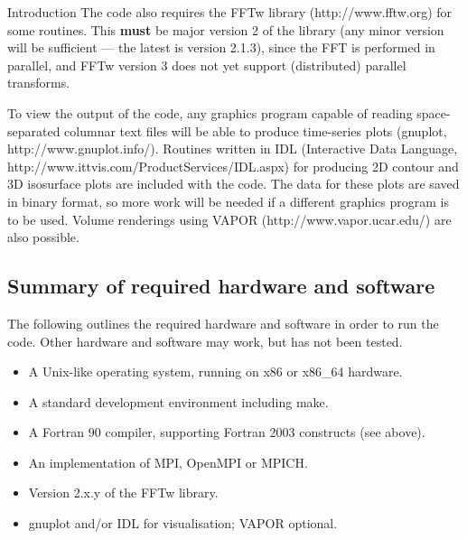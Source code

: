 \begin{chapter}{\label{cha:introduction}Introduction}
  The code also requires the FFTw library (http://www.fftw.org) for some
  routines.  This \textbf{must} be major version 2 of the library (any minor
  version will be sufficient --- the latest is version 2.1.3), since the FFT is
  performed in parallel, and FFTw version 3 does not yet support (distributed)
  parallel transforms.

  To view the output of the code, any graphics program capable of reading
  space-separated columnar text files will be able to produce time-series plots
  (\eg gnuplot, http://www.gnuplot.info/).  Routines written in IDL
  (Interactive Data Language, http://www.ittvis.com/ProductServices/IDL.aspx)
  for producing 2D contour and 3D isosurface plots are included with the code.
  The data for these plots are saved in binary format, so more work will be
  needed if a different graphics program is to be used.  Volume renderings
  using VAPOR (http://www.vapor.ucar.edu/) are also possible.

  \subsection{Summary of required hardware and software}
  The following outlines the required hardware and software in order to run the
  code.  Other hardware and software may work, but has not been tested.
  \begin{itemize}
    \item A Unix-like operating system, running on x86 or x86\_64 hardware.
    \item A standard development environment including make.
    \item A Fortran 90 compiler, supporting Fortran 2003 constructs (see
      above).
    \item An implementation of MPI, \eg OpenMPI or MPICH.
    \item Version 2.x.y of the FFTw library.
    \item gnuplot and/or IDL for visualisation; VAPOR optional.
  \end{itemize}


\end{chapter}
